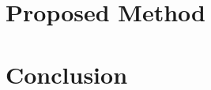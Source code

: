 \documentclass{article} %
\begin{document}
\section{Proposed Method}
\label{sec:New}


\section{Conclusion}
\label{sec:Conclusion}



\end{document}
